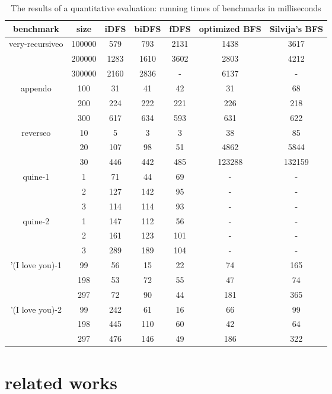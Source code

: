 \documentclass[format=acmlarge, review=true, authordraft=true]{acmart}
\begin{document}
\begin{table}
\begin{tabular}{|c|c|c|c|c|c|c|}
	\hline 
	benchmark & size & iDFS & biDFS & fDFS & optimized BFS & Silvija's BFS  \\
	\hline
	very-recursiveo & 100000 &  579 &  793 & 2131 & 1438 & 3617 \\
	                & 200000 & 1283 & 1610 & 3602 & 2803 & 4212 \\
	                & 300000 & 2160 & 2836 &    - & 6137 &    - \\
	\hline 
	appendo  & 100 &  31 &  41 &  42 &  31 &  68 \\ 
	         & 200 & 224 & 222 & 221 & 226 & 218 \\ 
	         & 300 & 617 & 634 & 593 & 631 & 622 \\ 
	\hline 
	reverseo & 10 &   5 &   3 &   3 &     38 &     85 \\ 
		     & 20 & 107 &  98 &  51 &   4862 &   5844 \\
		     & 30 & 446 & 442 & 485 & 123288 & 132159 \\ 
    \hline
    quine-1 & 1 &  71 &  44 & 69 & - & - \\ 
	        & 2 & 127 & 142 & 95 & - & - \\ 
	        & 3 & 114 & 114 & 93 & - & - \\ 
	\hline
    quine-2 & 1 & 147 & 112 &  56 & - & - \\ 
	        & 2 & 161 & 123 & 101 & - & - \\ 
	        & 3 & 289 & 189 & 104 & - & - \\ 
	\hline 
	'(I love you)-1 &  99 & 56 & 15 & 22 &  74 & 165 \\ 
	                & 198 & 53 & 72 & 55 &  47 &  74 \\
	                & 297 & 72 & 90 & 44 & 181 & 365 \\ 
    \hline
    '(I love you)-2 &  99 & 242 &  61 & 16 &  66 &  99 \\ 
	                & 198 & 445 & 110 & 60 &  42 &  64 \\
	                & 297 & 476 & 146 & 49 & 186 & 322 \\ 
	\hline 
\end{tabular}
\caption{The results of a quantitative evaluation: running times of benchmarks in milliseconds}
\label{compare-efficiency}
\end{table}

\section{related works}
\end{document}
